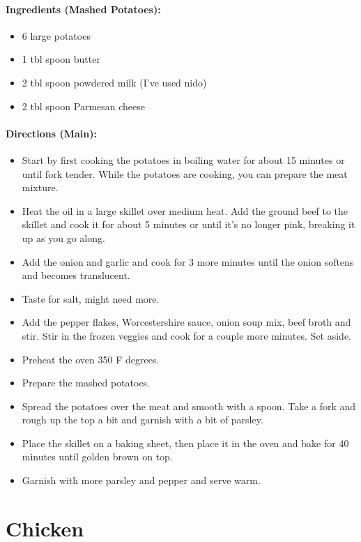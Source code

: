 \documentclass{article}
\begin{document}
\paragraph{Ingredients (Mashed Potatoes):}
\begin{itemize}
    \item 6 large potatoes
    \item 1 tbl spoon butter
    \item 2 tbl spoon powdered milk (I’ve used nido)
    \item 2 tbl spoon Parmesan cheese
\end{itemize}  

\paragraph{Directions (Main):}
\begin{itemize}
    \item Start by first cooking the potatoes in boiling water for about 15 minutes or until fork tender. While the potatoes are cooking, you can prepare the meat mixture.
    \item Heat the oil in a large skillet over medium heat. Add the ground beef to the skillet and cook it for about 5 minutes or until it’s no longer pink, breaking it up as you go along.
    \item Add the onion and garlic and cook for 3 more minutes until the onion softens and becomes translucent.
    \item Taste for salt, might need more.
    \item Add the pepper flakes, Worcestershire sauce, onion soup mix, beef broth and stir. Stir in the frozen veggies and cook for a couple more minutes. Set aside.
    \item Preheat the oven 350 F degrees.
    \item Prepare the mashed potatoes.
    \item Spread the potatoes over the meat and smooth with a spoon. Take a fork and rough up the top a bit and garnish with a bit of parsley.
    \item Place the skillet on a baking sheet, then place it in the oven and bake for 40 minutes until golden brown on top.
    \item Garnish with more parsley and pepper and serve warm.
\end{itemize} 

\section{Chicken}
\end{document}
